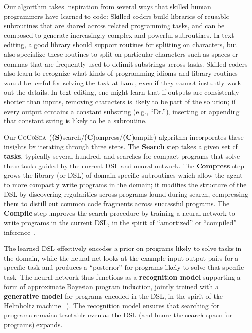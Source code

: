 \documentclass{article}
\newcommand{\system}{\textsc{CoCoSea}~}
\begin{document}
Our algorithm takes inspiration from several ways that skilled human
programmers have learned to code: Skilled coders build libraries of
reusable subroutines that are shared across related programming tasks,
and can be composed to generate increasingly complex and powerful
subroutines.  In text editing, a good library should support routines
for splitting on characters, but also specialize these routines to
split on particular characters such as spaces or commas that are
frequently used to delimit substrings across tasks.  Skilled coders
also learn to recognize what kinds of programming idioms and library
routines would be useful for solving the task at hand, even if they
cannot instantly work out the details.  In text editing, one might
learn that if outputs are consistently shorter than inputs, removing
characters is likely to be part of the solution; if every output
contains a constant substring (e.g., ``Dr.''), inserting or appending
that constant string is likely to be a subroutine.

Our \system (\textbf{(S)}search/\textbf{(C})ompress/\textbf{(C})ompile)
algorithm incorporates these insights by iterating through three steps. 
The \textbf{Search} step takes a given set of \textbf{tasks}, typically
several hundred, and searches for compact programs that solve these tasks
guided by the current DSL and neural network.
The \textbf{Compress} step grows the library (or DSL) of
domain-specific subroutines which allow the agent to more compactly
write programs in the domain; it modifies the structure of the DSL by
discovering regularities across programs found during search, compressing
them to distill out common code fragments across successful programs.
The \textbf{Compile} step improves the search procedure by training a neural network to
write programs in the current DSL, in the spirit of ``amortized'' or
``compiled'' inference~\cite{le2016inference}.%

The learned DSL effectively encodes a prior on programs likely to
solve tasks in the domain, while the neural net looks at the example
input-output pairs for a specific task and produces a ``posterior''
for programs likely to solve that specific task.  The neural network
thus functions as a \textbf{recognition model} supporting a form of
approximate Bayesian program induction, jointly trained with a
\textbf{generative model} for programs encoded in the DSL, in the
spirit of the Helmholtz machine ~\cite{hinton1995wake}). The
recognition model ensures that searching for programs remains
tractable even as the DSL (and hence the search space for programs)
expands.
\end{document}
